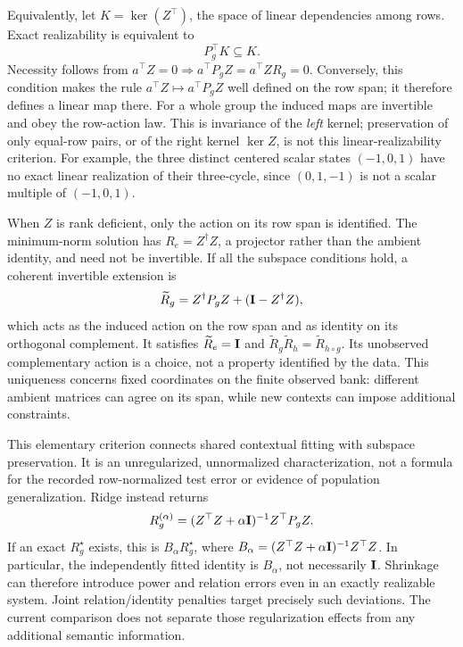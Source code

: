 Equivalently, let $K=\ker(Z^\top)$, the space of linear dependencies among rows. Exact realizability is equivalent to
\[
 P_g^\top K\subseteq K.
\]
Necessity follows from $a^\top Z=0\Rightarrow a^\top P_gZ=a^\top ZR_g=0$. Conversely, this condition makes the rule $a^\top Z\mapsto a^\top P_gZ$ well defined on the row span; it therefore defines a linear map there. For a whole group the induced maps are invertible and obey the row-action law. This is invariance of the \emph{left} kernel; preservation of only equal-row pairs, or of the right kernel $\ker Z$, is not this linear-realizability criterion. For example, the three distinct centered scalar states $(-1,0,1)$ have no exact linear realization of their three-cycle, since $(0,1,-1)$ is not a scalar multiple of $(-1,0,1)$.

When $Z$ is rank deficient, only the action on its row span is identified. The minimum-norm solution has $R_e=Z^\dagger Z$, a projector rather than the ambient identity, and need not be invertible. If all the subspace conditions hold, a coherent invertible extension is
\[
 \widetilde R_g=Z^\dagger P_gZ+(\mathbf{I}-Z^\dagger Z),
\]
which acts as the induced action on the row span and as identity on its orthogonal complement. It satisfies $\widetilde R_e=\mathbf{I}$ and $\widetilde R_g\widetilde R_h=\widetilde R_{h\circ g}$. Its unobserved complementary action is a choice, not a property identified by the data. This uniqueness concerns fixed coordinates on the finite observed bank: different ambient matrices can agree on its span, while new contexts can impose additional constraints.

This elementary criterion connects shared contextual fitting with subspace preservation. It is an unregularized, unnormalized characterization, not a formula for the recorded row-normalized test error or evidence of population generalization. Ridge instead returns
\[
 R_g^{(\alpha)}=(Z^\top Z+\alpha\mathbf{I})^{-1}Z^\top P_gZ.
\]
If an exact $R_g^\star$ exists, this is $B_\alpha R_g^\star$, where $B_\alpha=(Z^\top Z+\alpha\mathbf{I})^{-1}Z^\top Z$. In particular, the independently fitted identity is $B_\alpha$, not necessarily $\mathbf{I}$. Shrinkage can therefore introduce power and relation errors even in an exactly realizable system. Joint relation/identity penalties target precisely such deviations. The current comparison does not separate those regularization effects from any additional semantic information.

